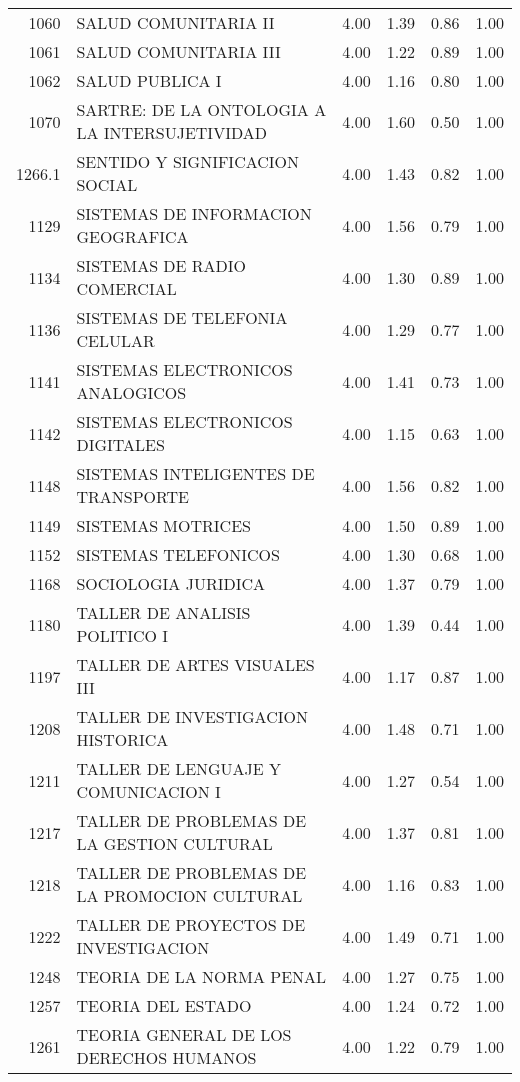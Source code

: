 \documentclass[12pt]{article}
\begin{document}
\begin{table}[ht]
\begin{tabular}{rlrrrr}
  1060 & SALUD COMUNITARIA II & 4.00 & 1.39 & 0.86 & 1.00 \\ 
  1061 & SALUD COMUNITARIA III & 4.00 & 1.22 & 0.89 & 1.00 \\ 
  1062 & SALUD PUBLICA I & 4.00 & 1.16 & 0.80 & 1.00 \\ 
  1070 & SARTRE: DE LA ONTOLOGIA A LA INTERSUJETIVIDAD & 4.00 & 1.60 & 0.50 & 1.00 \\ 
  1266.1 & SENTIDO Y SIGNIFICACION SOCIAL & 4.00 & 1.43 & 0.82 & 1.00 \\ 
  1129 & SISTEMAS DE INFORMACION GEOGRAFICA & 4.00 & 1.56 & 0.79 & 1.00 \\ 
  1134 & SISTEMAS DE RADIO COMERCIAL & 4.00 & 1.30 & 0.89 & 1.00 \\ 
  1136 & SISTEMAS DE TELEFONIA CELULAR & 4.00 & 1.29 & 0.77 & 1.00 \\ 
  1141 & SISTEMAS ELECTRONICOS ANALOGICOS & 4.00 & 1.41 & 0.73 & 1.00 \\ 
  1142 & SISTEMAS ELECTRONICOS DIGITALES & 4.00 & 1.15 & 0.63 & 1.00 \\ 
  1148 & SISTEMAS INTELIGENTES DE TRANSPORTE & 4.00 & 1.56 & 0.82 & 1.00 \\ 
  1149 & SISTEMAS MOTRICES & 4.00 & 1.50 & 0.89 & 1.00 \\ 
  1152 & SISTEMAS TELEFONICOS & 4.00 & 1.30 & 0.68 & 1.00 \\ 
  1168 & SOCIOLOGIA JURIDICA & 4.00 & 1.37 & 0.79 & 1.00 \\ 
  1180 & TALLER DE ANALISIS POLITICO I & 4.00 & 1.39 & 0.44 & 1.00 \\ 
  1197 & TALLER DE ARTES VISUALES III & 4.00 & 1.17 & 0.87 & 1.00 \\ 
  1208 & TALLER DE INVESTIGACION HISTORICA & 4.00 & 1.48 & 0.71 & 1.00 \\ 
  1211 & TALLER DE LENGUAJE Y COMUNICACION I & 4.00 & 1.27 & 0.54 & 1.00 \\ 
  1217 & TALLER DE PROBLEMAS DE LA GESTION CULTURAL & 4.00 & 1.37 & 0.81 & 1.00 \\ 
  1218 & TALLER DE PROBLEMAS DE LA PROMOCION CULTURAL & 4.00 & 1.16 & 0.83 & 1.00 \\ 
  1222 & TALLER DE PROYECTOS DE INVESTIGACION & 4.00 & 1.49 & 0.71 & 1.00 \\ 
  1248 & TEORIA DE LA NORMA PENAL & 4.00 & 1.27 & 0.75 & 1.00 \\ 
  1257 & TEORIA DEL ESTADO & 4.00 & 1.24 & 0.72 & 1.00 \\ 
  1261 & TEORIA GENERAL DE LOS DERECHOS HUMANOS & 4.00 & 1.22 & 0.79 & 1.00 \\ 

\end{tabular}
\end{table}
\end{document}
